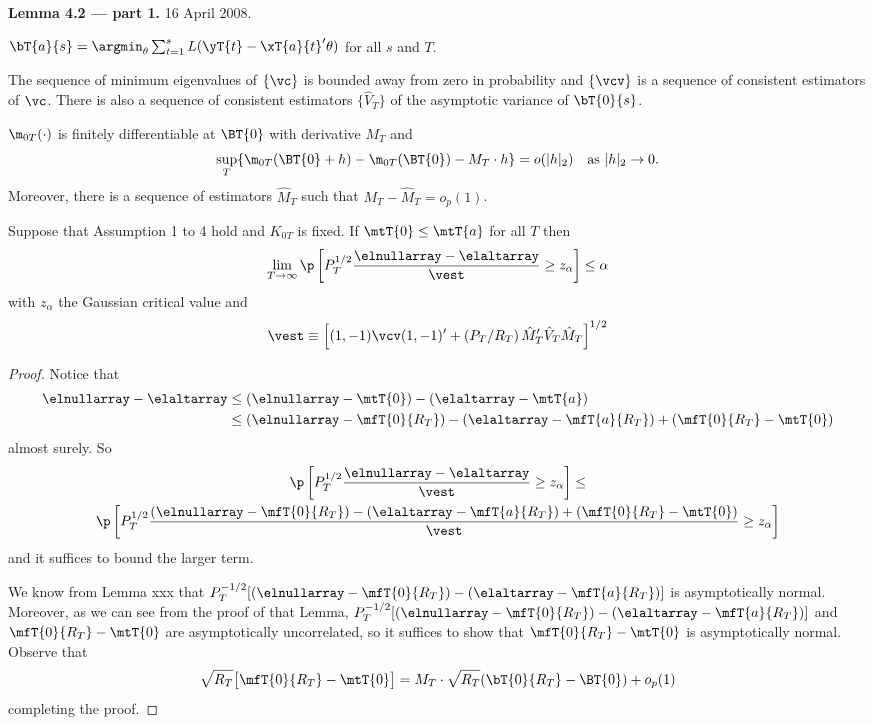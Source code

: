 

\textbf{Lemma 4.2 --- part 1.} 16 April 2008.


\begin{asmp}
  $\bT{a}{s} = \argmin_\theta \sum_{t=1}^s L(\yT{t} - \xT{a}{t}' \theta)$ 
  for all $s$ and $T$.
\end{asmp}

\begin{asmp}
  The sequence of minimum eigenvalues of $\{\vc\}$ is bounded away from zero
  in probability and $\{\vcv\}$ is a sequence of consistent estimators of
  $\vc$. There is also a sequence of consistent estimators 
  $\{\hat V_T\}$ of the asymptotic variance of $\bT{0}{s}$.
\end{asmp}

\begin{asmp}
  $\m_{0T}(\cdot)$ is finitely differentiable at $\BT{0}$
  with derivative $M_T$ and 
  \[
  \sup_T \{\m_{0T}(\BT{0} + h) - \m_{0T}(\BT{0}) - M_T \cdot h\} = o(|h|_2)
  \quad \text{as } |h|_2 \to 0.
  \]
  Moreover, there is a sequence of estimators $\hat M_T$ 
  such that $M_T - \hat M_T = o_p(1)$.
\end{asmp}

\begin{lem}
Suppose that Assumption 1 to 4 hold and $K_{0T}$ is fixed.
If $\mtT{0} \leq \mtT{a}$ for all $T$ then
\[
\lim_{T \to \infty} \p\left[P_T^{1/2} \frac{\elnullarray - \elaltarray}{\vest}
  \geq z_\alpha \right] \leq \alpha
\]
with $z_\alpha$ the Gaussian critical value and
\[
\vest\equiv \Big[ (1,-1) \vcv (1,-1)' + (P_T/R_T)\, \hat M_T' \hat V_T \hat M_T \Big]^{1/2}
\]
\end{lem}

\begin{proof}
  Notice that 
  \begin{align*}
  \elnullarray - \elaltarray 
  & \leq (\elnullarray - \mtT{0}) - (\elaltarray - \mtT{a}) \\
  & \leq (\elnullarray - \mfT{0}{R_T}) 
  - (\elaltarray - \mfT{a}{R_T})
  + (\mfT{0}{R_T} - \mtT{0})
  \end{align*}
  almost surely. So
  \begin{multline}
    \p\left[P_T^{1/2} \frac{\elnullarray - \elaltarray}{\vest}
      \geq z_\alpha \right]
    \leq \\
    \p\left[P_T^{1/2} \frac{(\elnullarray - \mfT{0}{R_T}) 
        - (\elaltarray - \mfT{a}{R_T})
        + (\mfT{0}{R_T} - \mtT{0})}{\vest}
      \geq z_\alpha \right]
  \end{multline}
  and it suffices to bound the larger term.

  We know from Lemma xxx that $P_T^{-1/2}[(\elnullarray - \mfT{0}{R_T})
  - (\elaltarray - \mfT{a}{R_T})]$ is asymptotically normal.  Moreover,
  as we can see from the proof of that Lemma, 
  $P_T^{-1/2}[(\elnullarray - \mfT{0}{R_T})
  - (\elaltarray - \mfT{a}{R_T})]$ and $\mfT{0}{R_T} - \mtT{0}$
  are asymptotically uncorrelated, so it suffices to show that
  $\mfT{0}{R_T} - \mtT{0}$ is asymptotically normal.  Observe that
  \[
  \sqrt{R_T} \big[\mfT{0}{R_T} - \mtT{0}\big]
  = M_T \cdot \sqrt{R_T}(\bT{0}{R_T} - \BT{0}) + o_p(1)
  \]
  completing the proof.
\end{proof}
